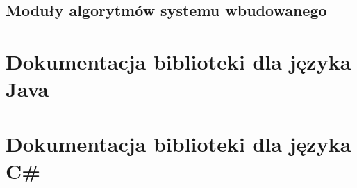\newpage
\subsection{Moduły algorytmów systemu wbudowanego}



\section{Dokumentacja biblioteki dla języka Java}
 

\section{Dokumentacja biblioteki dla języka C\#}
 


 